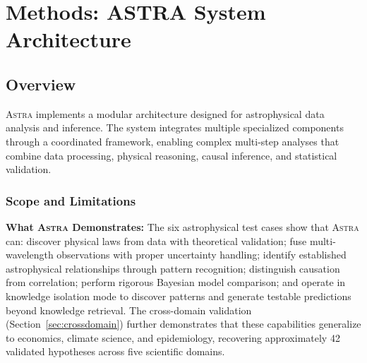 \documentclass[usenatbib]{rasti}
\newcommand{\astra}{\textsc{Astra}\xspace}
\begin{document}
\section{Methods: ASTRA System Architecture}
\label{sec:methods}

\subsection{Overview}
\label{sec:methods:overview}

\astra implements a modular architecture designed for astrophysical data analysis and inference.
The system integrates multiple specialized components through a coordinated framework, enabling complex multi-step analyses that combine data processing, physical reasoning, causal inference, and statistical validation.

\subsubsection{Scope and Limitations}
\label{sec:scope}

\textbf{What \astra Demonstrates:}
The six astrophysical test cases show that \astra can: discover physical laws from data with theoretical validation; fuse multi-wavelength observations with proper uncertainty handling; identify established astrophysical relationships through pattern recognition; distinguish causation from correlation; perform rigorous Bayesian model comparison; and operate in knowledge isolation mode to discover patterns and generate testable predictions beyond knowledge retrieval.
The cross-domain validation (Section~\ref{sec:crossdomain}) further demonstrates that these capabilities generalize to economics, climate science, and epidemiology, recovering approximately 42 validated hypotheses across five scientific domains.
\end{document}

